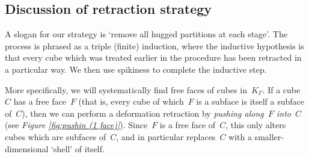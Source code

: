 \documentclass[11pt]{amsart}
\theoremstyle{definition}
\theoremstyle{definition}
\theoremstyle{definition}
\theoremstyle{definition}
\newcommand{\spine}{K_{\Gamma}} %
\begin{document}
\subsection*{Discussion of retraction strategy}

A slogan for our strategy is `remove all hugged partitions at each stage'. The process is phrased as a triple (finite) induction, where the inductive hypothesis is that every cube which was treated earlier in the procedure has been retracted in a particular way. We then use spikiness to complete the inductive step. 

More specifically, we will systematically find free faces of cubes in~$\spine$. If a cube~$C$ has a free face~$F$ (that is, every cube of which~$F$ is a subface is itself a subface of~$C$), then we can perform a deformation retraction by \emph{pushing along~$F$ into~$C$} (see \textit{Figure \ref{fig:pushin (1 face)}}). Since~$F$ is a free face of~$C$, this only alters cubes which are subfaces of~$C$, and in particular replaces~$C$ with a smaller-dimensional `shell' of itself. 
\end{document}
